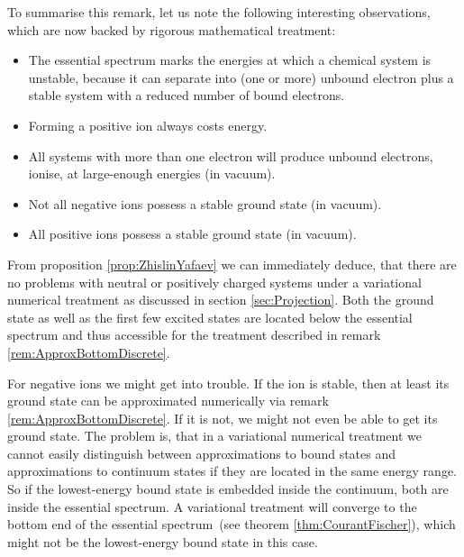 \begin{rem}
	To summarise this remark, let us note the following
	interesting observations,
	which are now backed by rigorous mathematical treatment:
	\begin{itemize}
		\item The essential spectrum marks the energies
			at which a chemical system is unstable,
			because it can separate into (one or more) unbound electron
			plus a stable system with a
			reduced number of bound electrons.
		\item Forming a positive ion always costs energy.
		\item All systems with more than one electron
			will produce unbound electrons,
			\ie ionise, at large-enough energies (in vacuum).
		\item Not all negative ions possess a stable ground state (in vacuum).
		\item All positive ions possess a stable ground state (in vacuum).
	\end{itemize}
\end{rem}

\begin{rem}
	\label{rem:ElectronicTISENumerical}
	From proposition \ref{prop:ZhislinYafaev}
	we can immediately deduce,
	that there are no problems with neutral or positively charged
	systems under a variational numerical treatment as discussed
	in section \vref{sec:Projection}.
	Both the ground state as well as the first few
	excited states are located below the
	essential spectrum and thus accessible for the treatment
	described in remark \vref{rem:ApproxBottomDiscrete}.

	For negative ions we might get into trouble.
	If the ion is stable,
	then at least its ground state can be approximated
	numerically via remark \ref{rem:ApproxBottomDiscrete}.
	If it is not, we might not even be able to get its ground state.
	The problem is, that in a variational numerical treatment
	we cannot easily distinguish between approximations
	to bound states and approximations to continuum states
	if they are located in the same energy range.
	So if the lowest-energy bound state is embedded inside the continuum,
	both are inside the essential spectrum.
	A variational treatment will converge to the bottom end
	of the essential spectrum~(see theorem \ref{thm:CourantFischer}),
	which might not be the lowest-energy bound state in this case.
\end{rem}
